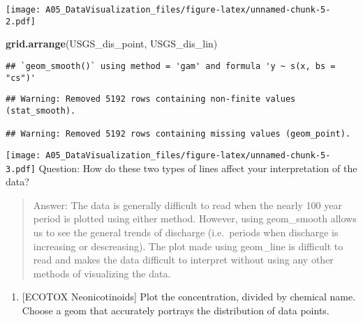 \documentclass[]{article}
\newenvironment{Shaded}{\begin{snugshade}}{\end{snugshade}}
\newcommand{\KeywordTok}[1]{\textcolor[rgb]{0.13,0.29,0.53}{\textbf{#1}}}
\newcommand{\NormalTok}[1]{#1}
\providecommand{\tightlist}{%
  \setlength{\itemsep}{0pt}\setlength{\parskip}{0pt}}
\begin{document}
\texttt{[image: A05\_DataVisualization\_files/figure-latex/unnamed-chunk-5-2.pdf]}

\begin{Shaded}
\begin{Highlighting}[]
\KeywordTok{grid.arrange}\NormalTok{(USGS_dis_point, USGS_dis_lin)}
\end{Highlighting}
\end{Shaded}

\begin{verbatim}
## `geom_smooth()` using method = 'gam' and formula 'y ~ s(x, bs = "cs")'
\end{verbatim}

\begin{verbatim}
## Warning: Removed 5192 rows containing non-finite values (stat_smooth).

## Warning: Removed 5192 rows containing missing values (geom_point).
\end{verbatim}

\texttt{[image: A05\_DataVisualization\_files/figure-latex/unnamed-chunk-5-3.pdf]}
Question: How do these two types of lines affect your interpretation of
the data?

\begin{quote}
Answer: The data is generally difficult to read when the nearly 100 year
period is plotted using either method. However, using geom\_smooth
allows us to see the general trends of discharge (i.e.~periods when
discharge is increasing or descreasing). The plot made using geom\_line
is difficult to read and makes the data difficult to interpret without
using any other methods of visualizing the data.
\end{quote}

\begin{enumerate}
\def\labelenumi{\arabic{enumi}.}
\setcounter{enumi}{6}
\tightlist
\item
  {[}ECOTOX Neonicotinoids{]} Plot the concentration, divided by
  chemical name. Choose a geom that accurately portrays the distribution
  of data points.
\end{enumerate}
\end{document}
